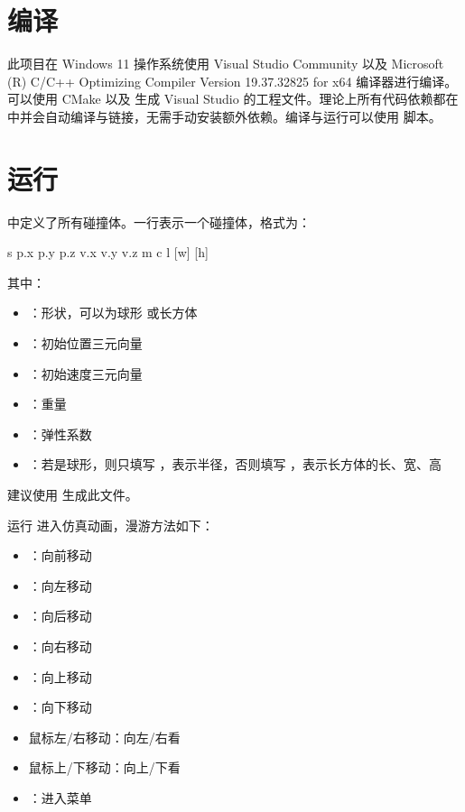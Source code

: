 


\section{编译}

此项目在 Windows 11 操作系统使用 Visual Studio Community 以及 Microsoft (R) C/C++ Optimizing Compiler Version 19.37.32825 for x64 编译器进行编译。可以使用 CMake 以及  生成 Visual Studio 的工程文件。理论上所有代码依赖都在  中并会自动编译与链接，无需手动安装额外依赖。编译与运行可以使用  脚本。

\section{运行}

 中定义了所有碰撞体。一行表示一个碰撞体，格式为：

\begin{codeblock}
s p.x p.y p.z v.x v.y v.z m c l [w] [h]
\end{codeblock}

其中：

\begin{itemize}
    \item {}：形状，可以为球形  或长方体 
    \item {}：初始位置三元向量
    \item {}：初始速度三元向量
    \item {}：重量
    \item {}：弹性系数
    \item {}：若是球形，则只填写 ，表示半径，否则填写 ，表示长方体的长、宽、高
\end{itemize}

建议使用  生成此文件。

运行  进入仿真动画，漫游方法如下：

\begin{multicols}{2}

\begin{itemize}
    \item {}：向前移动
    \item {}：向左移动
    \item {}：向后移动
    \item {}：向右移动
    \columnbreak
    \item \keys{\SPACE}：向上移动
    \item \keys{\shift}：向下移动
    \item 鼠标左/右移动：向左/右看
    \item 鼠标上/下移动：向上/下看
    \item {}：进入菜单
\end{itemize}

\end{multicols}

